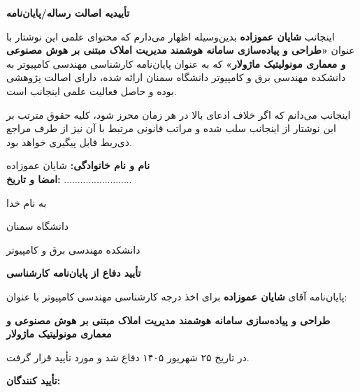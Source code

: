 \documentclass[11pt, a4paper]{report}
\begin{document}
\clearpage
\thispagestyle{empty}
\vspace*{1.5cm}
\begin{center}
    {\Large \bfseries تأییدیه اصالت رساله/پایان‌نامه \par}
\end{center}
\vspace{1.2cm}
اینجانب \textbf{شایان عموزاده} بدین‌وسیله اظهار می‌دارم که محتوای علمی این نوشتار با عنوان \textbf{«طراحی و پیاده‌سازی سامانه هوشمند مدیریت املاک مبتنی بر هوش مصنوعی و معماری مونولیتیک ماژولار»} که به عنوان پایان‌نامه کارشناسی مهندسی کامپیوتر به دانشکده مهندسی برق و کامپیوتر دانشگاه سمنان ارائه شده، دارای اصالت پژوهشی بوده و حاصل فعالیت علمی اینجانب است.

اینجانب می‌دانم که اگر خلاف ادعای بالا در هر زمان محرز شود، کلیه حقوق مترتب بر این نوشتار از اینجانب سلب شده و مراتب قانونی مرتبط با آن نیز از طرف مراجع ذی‌ربط قابل پیگیری خواهد بود.
\vspace{2.5cm}
\begin{flushleft}
    \textbf{نام و نام خانوادگی:} شایان عموزاده \\
    \textbf{امضا و تاریخ:} .........................
\end{flushleft}

\clearpage
\thispagestyle{empty}
\begin{center}
    {\large به نام خدا \par}
    {\large دانشگاه سمنان \par}
    {\large دانشکده مهندسی برق و کامپیوتر \par}
    \vspace{0.8cm}
    {\Large \bfseries تأیید دفاع از پایان‌نامه کارشناسی \par}
\end{center}
\vspace{0.8cm}
پایان‌نامه آقای \textbf{شایان عموزاده} برای اخذ درجه کارشناسی مهندسی کامپیوتر با عنوان:
\vspace{0.4cm}
\begin{center}
    {\Large \bfseries طراحی و پیاده‌سازی سامانه هوشمند مدیریت املاک مبتنی بر هوش مصنوعی و معماری مونولیتیک ماژولار \par}
\end{center}
\vspace{0.4cm}
در تاریخ ۲۵ شهریور ۱۴۰۵ دفاع شد و مورد تأیید قرار گرفت.
\vspace{1.5cm}

\noindent \textbf{تأیید کنندگان:}
\vspace{0.8cm}
\end{document}
